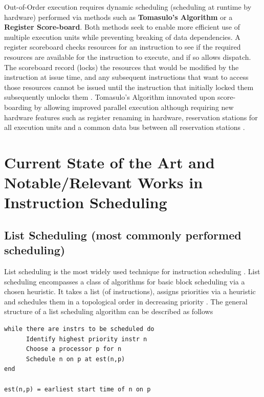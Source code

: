 \documentclass[12pt]{report}
\def\mytitle{??? Program Code ???}
\begin{document}
Out-of-Order execution requires dynamic scheduling (scheduling at runtime by
hardware) performed via methods such as \textbf{Tomasulo's Algorithm} or a \textbf{Register
Score-board}. Both methods seek to enable more efficient use of multiple
execution units while preventing breaking of data dependencies. A register
scoreboard checks resources for an instruction to see if the required
resources are available for the instruction to execute, and if so allows
dispatch. The scoreboard record (locks) the resources that would be modified
by the instruction at issue time, and any subsequent instructions that want to
access those resources cannot be issued until the instruction that initially
locked them subsequently unlocks them \parencite{popescu1997processor}.
Tomasulo's Algorithm innovated upon score-boarding by allowing improved parallel
execution although requiring new hardware features such as register renaming
in hardware, reservation stations for all execution units and a common data
bus between all reservation stations \parencite{tomasulo1967efficient}.

\chapter{Current State of the Art and Notable/Relevant Works in Instruction Scheduling}
\label{sec:org3dabd25}
\section{List Scheduling (most commonly performed scheduling)}
\label{sec:org6a8a2cb}
List scheduling is the most widely used technique for instruction scheduling
\parencite{gibbons1986efficient}. List scheduling encompasses a class of
algorithms for basic block scheduling via a chosen heuristic. It takes a list (of
instructions), assigns priorities via a heuristic and schedules them in a
topological order in decreasing priority \parencite{wang2018list}. The
general structure of a list scheduling algorithm can be described as follows

\def\mytitle{{\sc Basic Structure of List Scheduling Algorithms \hspace{12em} \color{grey}{.} }}
\begin{verbatim}
while there are instrs to be scheduled do 
      Identify highest priority instr n
      Choose a processor p for n
      Schedule n on p at est(n,p)
end

est(n,p) = earliest start time of n on p
\end{verbatim}
\end{document}
